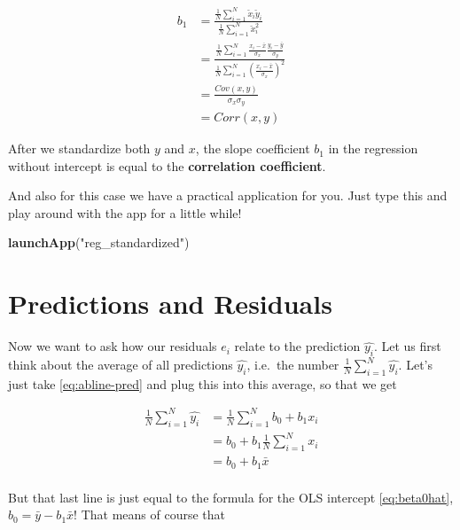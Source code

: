 \documentclass[]{book}
\newenvironment{Shaded}{\begin{snugshade}}{\end{snugshade}}
\newcommand{\KeywordTok}[1]{\textcolor[rgb]{0.13,0.29,0.53}{\textbf{#1}}}
\newcommand{\StringTok}[1]{\textcolor[rgb]{0.31,0.60,0.02}{#1}}
\newcommand{\NormalTok}[1]{#1}
\newenvironment{tip}{\begin{tcolorbox}[colback=green!5!white,colframe=green,title=\textbf{Tip:}]}{\end{tcolorbox}}
\theoremstyle{definition}
\theoremstyle{definition}
\theoremstyle{definition}
\theoremstyle{remark}
\begin{document}
\begin{align}
b_1 &= \frac{\frac{1}{N}\sum_{i=1}^N \breve{x}_i \breve{y}_i}{\frac{1}{N}\sum_{i=1}^N \breve{x}_i^2}\\
    &= \frac{\frac{1}{N}\sum_{i=1}^N \frac{x_i - \bar{x}}{\sigma_x} \frac{y_i - \bar{y}}{\sigma_y}}{\frac{1}{N}\sum_{i=1}^N \left(\frac{x_i - \bar{x}}{\sigma_x}\right)^2} \\
    &= \frac{Cov(x,y)}{\sigma_x \sigma_y} \\
    &= Corr(x,y)  \label{eq:bline-standardized}
\end{align}

\begin{tip}
After we standardize both \(y\) and \(x\), the slope coefficient \(b_1\)
in the regression without intercept is equal to the \textbf{correlation
coefficient}.
\end{tip}

 And also for this case we have a practical application for you. Just
type this and play around with the app for a little while!

\begin{Shaded}
\begin{Highlighting}[]
\KeywordTok{launchApp}\NormalTok{(}\StringTok{"reg_standardized"}\NormalTok{)}
\end{Highlighting}
\end{Shaded}

\section{Predictions and Residuals}\label{pred-resids}

Now we want to ask how our residuals \(e_i\) relate to the prediction
\(\hat{y_i}\). Let us first think about the average of all predictions
\(\hat{y_i}\), i.e.~the number \(\frac{1}{N} \sum_{i=1}^N \hat{y_i}\).
Let's just take \eqref{eq:abline-pred} and plug this into this average, so
that we get

\begin{align}
\frac{1}{N} \sum_{i=1}^N \hat{y_i} &= \frac{1}{N} \sum_{i=1}^N b_0 + b_1 x_i \\
&= b_0 + b_1  \frac{1}{N} \sum_{i=1}^N x_i \\
&= b_0 + b_1  \bar{x} \\
\end{align}

But that last line is just equal to the formula for the OLS intercept
\eqref{eq:beta0hat}, \(b_0 = \bar{y} - b_1 \bar{x}\)! That means of course
that
\end{document}
